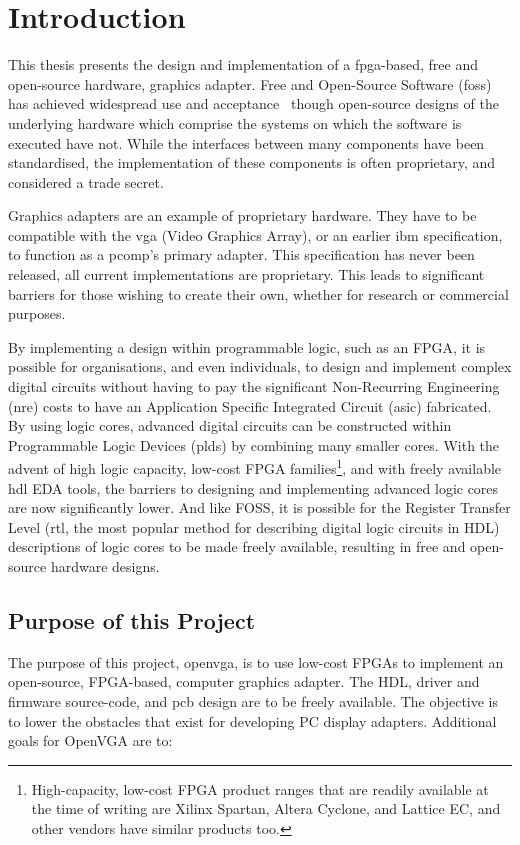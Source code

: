 \chapter{Introduction}
This thesis presents the design and implementation of a
\gls{fpga}-based,
free and open-source hardware, graphics adapter. Free and Open-Source Software
(\gls{foss}) has
achieved widespread use and acceptance~\cite{lerner2002sse} though open-source
designs of the underlying hardware which comprise the systems on which the
software is executed have not. While the interfaces between many components have
been standardised, the implementation of these components is often proprietary,
and considered a trade secret.

Graphics adapters are an example of proprietary hardware. They have to be
compatible with the \gls{vga} (Video Graphics Array), or an earlier \gls{ibm} specification, to function as a
\gls{pcomp}'s primary adapter. This
specification has never been released, all current implementations are
proprietary. This leads to significant barriers for those wishing to create their
own, whether for research or commercial purposes.

By implementing a design within programmable logic, such as an FPGA, it is
possible for organisations, and even individuals, to design and implement complex
digital circuits without having to pay the significant Non-Recurring
Engineering (\gls{nre}) costs
to have an Application Specific Integrated Circuit (\gls{asic}) fabricated. By
using logic cores, advanced digital circuits can be constructed within
Programmable Logic Devices (\gls{pld}s) by combining many smaller cores. With the advent of high logic
capacity, low-cost FPGA families\footnote{High-capacity, low-cost FPGA product
ranges that are readily available at the time of writing are Xilinx Spartan,
Altera Cyclone, and Lattice EC, and other vendors have similar products too.},
and with freely available \gls{hdl} EDA tools, the barriers to designing and
implementing advanced logic cores are now significantly lower. And like FOSS, it
is possible for the Register Transfer Level (\gls{rtl}, the most popular method for
describing digital logic circuits in HDL) descriptions of logic cores to be made
freely available, resulting in free and open-source hardware designs.


\section{Purpose of this Project}
The purpose of this project, \gls{openvga}, is to
use low-cost FPGAs to implement an open-source, FPGA-based, computer graphics
adapter. The HDL, driver and firmware source-code, and \gls{pcb} design are to be freely available. The
objective is to lower the obstacles that exist for developing PC display
adapters. Additional goals for OpenVGA are to:

